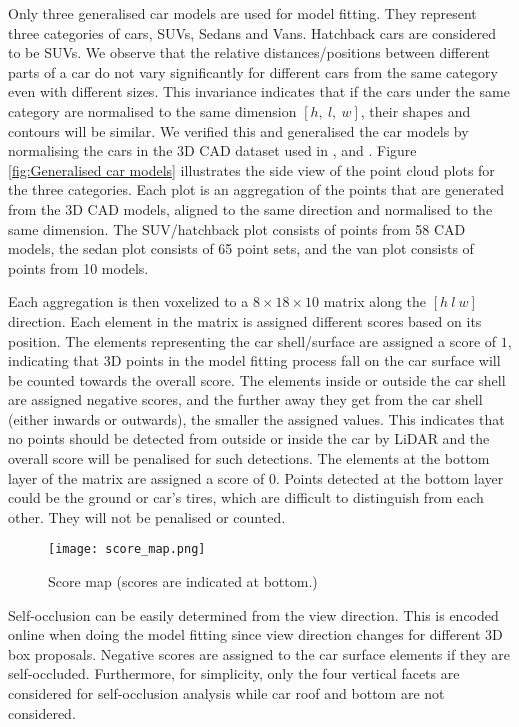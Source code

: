 \documentclass[letterpaper, 10 pt, conference]{ieeeconf}  \usepackage[
\begin{document}
Only three generalised car models are used for model fitting. They represent three categories of cars, SUVs, Sedans and Vans. Hatchback cars are considered to be SUVs. We observe that the relative distances/positions between different parts of a car do not vary significantly for different cars from the same category even with different sizes. This invariance indicates that if the cars under the same category are normalised to the same dimension $[h,~l,~w]$, their shapes and contours will be similar. We verified this and generalised the car models by normalising the cars in the 3D CAD dataset used in \cite{deepmanta_cvpr17}, \cite{fidler20123d} and \cite{chen2014beat}. Figure \ref{fig:Generalised car models} illustrates the side view of the point cloud plots for the three categories. Each plot is an aggregation of the points that are generated from the 3D CAD models, aligned to the same direction and normalised to the same dimension. The SUV/hatchback plot consists of points from 58 CAD models, the sedan plot consists of 65 point sets, and the van plot consists of points from 10 models.

Each aggregation is then voxelized to a $8\times 18 \times 10$ matrix along the $[h~l~w]$ direction. Each element in the matrix is assigned different scores based on its position. The elements representing the car shell/surface are assigned a score of $1$, indicating that 3D points in the model fitting process fall on the car surface will be counted towards the overall score. The elements inside or outside the car shell are assigned negative scores, and the further away they get from the car shell (either inwards or outwards), the smaller the assigned values. This indicates that no points should be detected from outside or inside the car by LiDAR and the overall score will be penalised for such detections. The elements at the bottom layer of the matrix are assigned a score of $0$. Points detected at the bottom layer could be the ground or car's tires, which are difficult to distinguish from each other. They will not be penalised or counted.

\begin{figure}[h!]
\centering
     \texttt{[image: score\_map.png]}
    \caption{Score map (scores are indicated at bottom.)}
    \label{fig:Score map}
\end{figure}

Self-occlusion can be easily determined from the view direction. This is encoded online when doing the model fitting since view direction changes for different 3D box proposals. Negative scores are assigned to the car surface elements if they are self-occluded. Furthermore, for simplicity, only the four vertical facets are considered for self-occlusion analysis while car roof and bottom are not considered.
\end{document}
